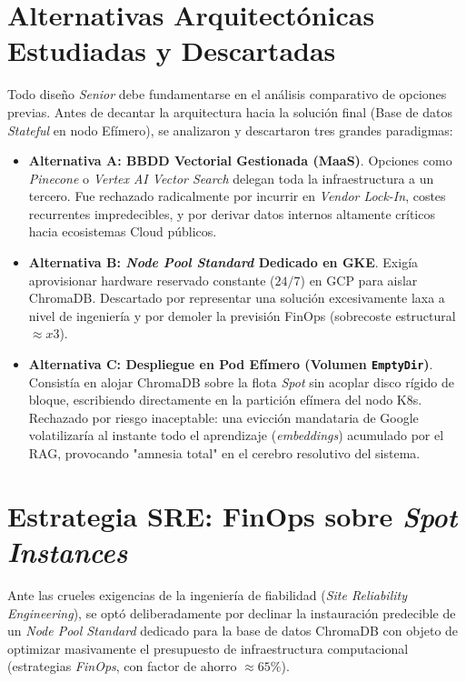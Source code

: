 \section{Alternativas Arquitectónicas Estudiadas y Descartadas}
Todo diseño \textit{Senior} debe fundamentarse en el análisis comparativo de opciones previas. Antes de decantar la arquitectura hacia la solución final (Base de datos \textit{Stateful} en nodo Efímero), se analizaron y descartaron tres grandes paradigmas:

\begin{itemize}
    \item \textbf{Alternativa A: BBDD Vectorial Gestionada (MaaS)}. Opciones como \textit{Pinecone} o \textit{Vertex AI Vector Search} delegan toda la infraestructura a un tercero. Fue rechazado radicalmente por incurrir en \textit{Vendor Lock-In}, costes recurrentes impredecibles, y por derivar datos internos altamente críticos hacia ecosistemas Cloud públicos.
    \item \textbf{Alternativa B: \textit{Node Pool Standard} Dedicado en GKE}. Exigía aprovisionar hardware reservado constante ($24/7$) en GCP para aislar ChromaDB. Descartado por representar una solución excesivamente laxa a nivel de ingeniería y por demoler la previsión FinOps (sobrecoste estructural $\approx\! x3$).
    \item \textbf{Alternativa C: Despliegue en Pod Efímero (Volumen \texttt{EmptyDir})}. Consistía en alojar ChromaDB sobre la flota \textit{Spot} sin acoplar disco rígido de bloque, escribiendo directamente en la partición efímera del nodo K8s. Rechazado por riesgo inaceptable: una evicción mandataria de Google volatilizaría al instante todo el aprendizaje (\textit{embeddings}) acumulado por el RAG, provocando "amnesia total" en el cerebro resolutivo del sistema.
\end{itemize}

\section{Estrategia SRE: FinOps sobre \textit{Spot Instances}}
Ante las crueles exigencias de la ingeniería de fiabilidad (\textit{Site Reliability Engineering}), se optó deliberadamente por declinar la instauración predecible de un \textit{Node Pool Standard} dedicado para la base de datos ChromaDB con objeto de optimizar masivamente el presupuesto de infraestructura computacional (estrategias \textit{FinOps}, con factor de ahorro $\approx\! 65\%$).

